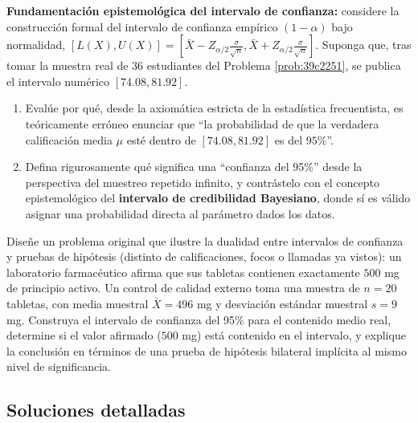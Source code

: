 \begin{problema}
	\label{prob:a3ef454}
	\textbf{Fundamentación epistemológica del intervalo de confianza:} considere la construcción formal del intervalo de confianza empírico $(1-\alpha)$ bajo normalidad, $[L(X), U(X)] = \left[ \bar{X} - Z_{\alpha/2}\frac{\sigma}{\sqrt{n}}, \bar{X} + Z_{\alpha/2}\frac{\sigma}{\sqrt{n}} \right]$. Suponga que, tras tomar la muestra real de 36 estudiantes del Problema \ref{prob:39c2251}, se publica el intervalo numérico $[74.08, 81.92]$.
	\begin{enumerate}
		\item Evalúe por qué, desde la axiomática estricta de la estadística frecuentista, es teóricamente erróneo enunciar que ``la probabilidad de que la verdadera calificación media $\mu$ esté dentro de $[74.08, 81.92]$ es del $95\%$''.
		\item Defina rigurosamente qué significa una ``confianza del 95\%'' desde la perspectiva del muestreo repetido infinito, y contrástelo con el concepto epistemológico del \textbf{intervalo de credibilidad Bayesiano}, donde sí es válido asignar una probabilidad directa al parámetro dados los datos.
	\end{enumerate}
\end{problema}

\begin{problema}
	\label{prob:18d6b96}
	Diseñe un problema original que ilustre la dualidad entre intervalos de confianza y pruebas de hipótesis (distinto de calificaciones, focos o llamadas ya vistos): un laboratorio farmacéutico afirma que sus tabletas contienen exactamente $500$ mg de principio activo. Un control de calidad externo toma una muestra de $n=20$ tabletas, con media muestral $\bar{X}=496$ mg y desviación estándar muestral $s=9$ mg. Construya el intervalo de confianza del 95\% para el contenido medio real, determine si el valor afirmado ($500$ mg) está contenido en el intervalo, y explique la conclusión en términos de una prueba de hipótesis bilateral implícita al mismo nivel de significancia.
\end{problema}

\subsection*{Soluciones detalladas}

